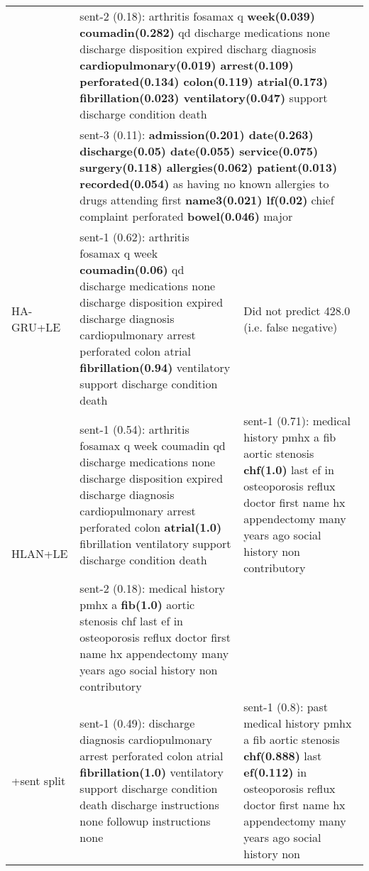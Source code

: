 \documentclass[final,5p,times,twocolumn]{elsarticle}
\begin{document}
\begin{table*}[th]
\begin{threeparttable}
\begin{tabular}{lp{7.5cm}||p{7.5cm}}
\cline{2-3}
                         & \multicolumn{2}{p{15cm}}{sent-2 (0.18): arthritis fosamax q \textbf{week(0.039)} \textbf{coumadin(0.282)} qd discharge medications none discharge disposition expired discharg diagnosis \textbf{cardiopulmonary(0.019)   arrest(0.109) perforated(0.134) colon(0.119) atrial(0.173) fibrillation(0.023) ventilatory(0.047)} support discharge condition death}\\
\cline{2-3}
                         & \multicolumn{2}{p{15cm}}{sent-3 (0.11): \textbf{admission(0.201) date(0.263) discharge(0.05) date(0.055) service(0.075) surgery(0.118) allergies(0.062) patient(0.013) recorded(0.054)} as having no known allergies to drugs attending first \textbf{name3(0.021) lf(0.02)} chief complaint perforated \textbf{bowel(0.046)} major}\\
\cline{1-3}
HA-GRU+LE                & sent-1 (0.62): arthritis fosamax q week \textbf{coumadin(0.06)} qd   discharge medications none discharge disposition   expired discharge diagnosis cardiopulmonary arrest   perforated colon atrial \textbf{fibrillation(0.94)} ventilatory   support discharge condition death & Did not predict 428.0 (i.e. false negative)                                                                                                                                                                                                                                                                                                   \\
\cline{1-3}
\multirow{2}{*}{HLAN+LE} & sent-1 (0.54): arthritis fosamax q week coumadin qd   discharge medications none discharge disposition   expired discharge diagnosis cardiopulmonary arrest   perforated colon \textbf{atrial(1.0)} fibrillation ventilatory   support discharge condition death   & sent-1 (0.71): medical history   pmhx a fib aortic stenosis \textbf{chf(1.0)} last   ef in osteoporosis reflux doctor first   name hx appendectomy many years ago social   history non contributory \\
\cline{2-2}
                         & sent-2 (0.18): medical   history pmhx a \textbf{fib(1.0)} aortic stenosis chf   last ef in osteoporosis reflux doctor   first name hx appendectomy many years ago   social history non contributory &\\
\cline{2-3}
\multirow{2}{*}{+sent split} & sent-1 (0.49): discharge diagnosis cardiopulmonary arrest perforated colon atrial \textbf{fibrillation(1.0)} ventilatory support discharge condition death discharge instructions none followup instructions none   & sent-1 (0.8):  past medical history pmhx a fib aortic stenosis \textbf{chf(0.888)} last \textbf{ef(0.112)} in osteoporosis reflux doctor first name hx appendectomy many years ago social history non \\

\end{tabular}
\end{threeparttable}
\end{table*}
\end{document}
